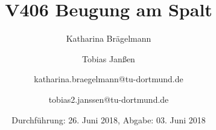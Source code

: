 
\title{V406 Beugung am Spalt}
\author{Katharina Brägelmann \and Tobias Janßen \and katharina.braegelmann@tu-dortmund.de \and tobias2.janssen@tu-dortmund.de}
\date{Durchführung: 26. Juni 2018, Abgabe: 03. Juni 2018}
\maketitle

\tableofcontents
